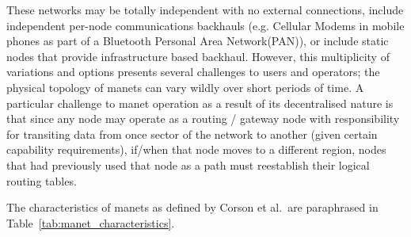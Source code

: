 These networks may be totally independent with no external connections, include independent per-node communications backhauls (e.g.
Cellular Modems in mobile phones as part of a Bluetooth Personal Area Network(PAN)), or include static nodes that provide infrastructure based backhaul.
However, this multiplicity of variations and options presents several challenges to users and operators; the physical topology of \gls{manet}s can vary wildly over short periods of time.
A particular challenge to \gls{manet} operation as a result of its decentralised nature is that since any node may operate as a routing / gateway node with responsibility for transiting data from once sector of the network to another (given certain capability requirements), if/when that node moves to a different region, nodes that had previously used that node as a path must reestablish their logical routing tables.

The characteristics of \gls{manet}s as defined by Corson et al.\ are paraphrased in Table~\ref{tab:manet_characteristics}.

